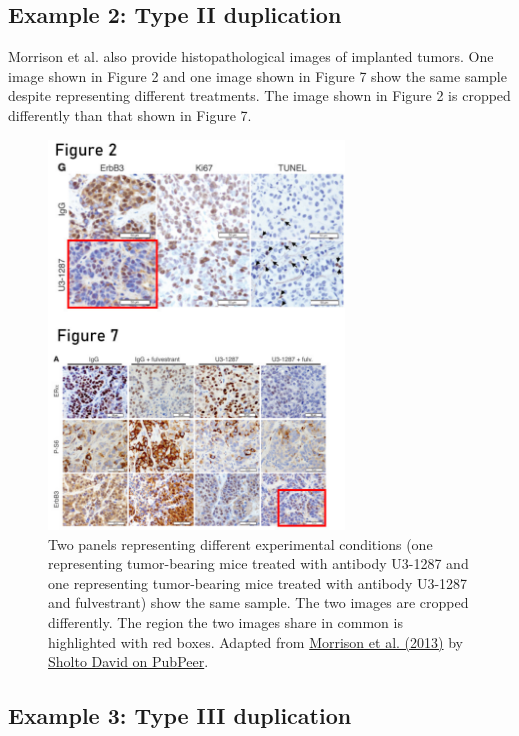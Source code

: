 \documentclass[letterpaper, 12pt]{article}
\begin{document}
\pagebreak

\subsection*{Example 2: Type II duplication}

Morrison et al. also provide histopathological images of implanted tumors. One image shown in Figure 2 and one image shown in Figure 7 show the same sample despite representing different treatments. The image shown in Figure 2 is cropped differently than that shown in Figure 7.

\begin{figure}[h!tbp]
    \centering
    \includegraphics[width=0.7\textwidth]{img/image_duplication/image-1744937642757.jpg}
    \caption*{Two panels representing different experimental conditions (one representing tumor-bearing mice treated with antibody U3-1287 and one representing tumor-bearing mice treated with antibody U3-1287 and fulvestrant) show the same sample. The two images are cropped differently. The region the two images share in common is highlighted with red boxes. Adapted from \href{https://doi.org/10.1172/JCI66764}{Morrison et al. (2013)} by \href{https://pubpeer.com/publications/2768B5B42E7338AB72D4CFE660596A\#2}{Sholto David on PubPeer}.}
\end{figure}

\subsection*{Example 3: Type III duplication}
\end{document}

